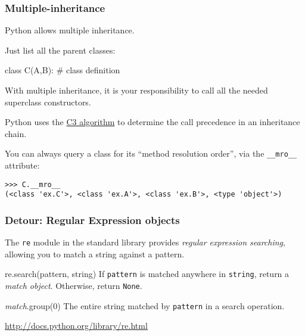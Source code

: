 \documentclass[english,serif,mathserif,xcolor=pdftex,dvipsnames,table]{beamer}
\begin{document}
\begin{frame}[fragile]
  \frametitle{Multiple-inheritance}
  Python allows multiple inheritance.

  \+
  Just list all the parent classes:
  \begin{python}
class C(A,B):
  # class definition
  \end{python}
  
  \+
  With multiple inheritance, it is your responsibility to call all the
  needed superclass constructors.

  \+ 
  Python uses the
  \href{http://www.python.org/download/releases/2.3/mro/}{C3
    algorithm} to determine the call precedence in an inheritance
  chain.

  \+
  You can always query a class for its ``method resolution order'',
  via the \lstinline|__mro__| attribute:
  \begin{lstlisting}[basicstyle=\scriptsize\ttfamily]
>>> C.__mro__
(<class 'ex.C'>, <class 'ex.A'>, <class 'ex.B'>, <type 'object'>)
  \end{lstlisting}
\end{frame}


\begin{frame}
  \frametitle{Detour: Regular Expression objects}
  The \texttt{re} module in the standard library provides
  \emph{regular expression searching}, allowing you to match a string
  against a pattern.

  \+
  \begin{describe}{re.search(pattern, string)}
    If \texttt{pattern} is matched anywhere in \texttt{string}, return
    a \emph{match object}.  Otherwise, return \texttt{None}.
  \end{describe}

  \+
  \begin{describe}{\emph{match}.group(0)}
    The entire string matched by \texttt{pattern} in a search operation.
  \end{describe}

  \+
  \begin{references}
    \url{http://docs.python.org/library/re.html}
  \end{references}
\end{frame}
\end{document}
